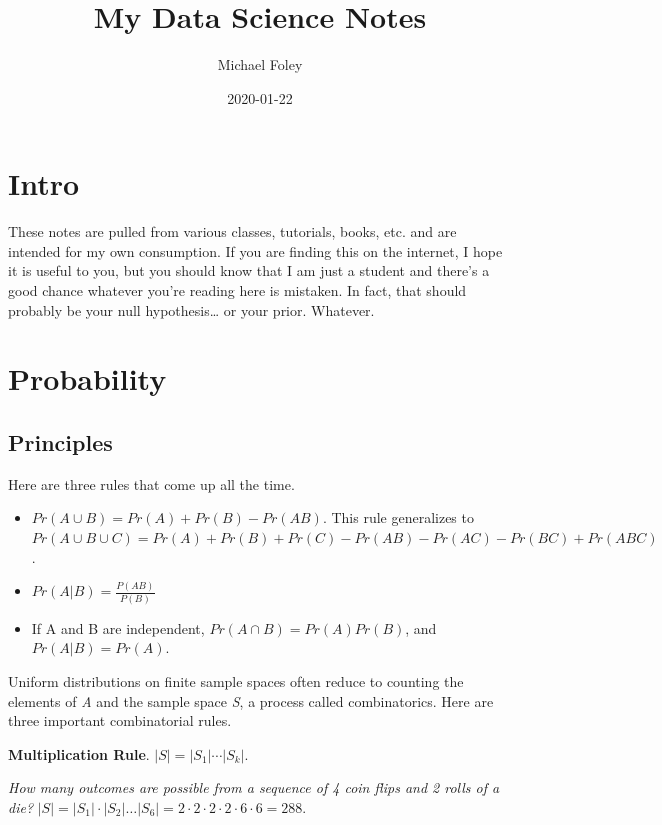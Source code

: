 \documentclass[]{book}
\title{My Data Science Notes}
\author{Michael Foley}
\date{2020-01-22}
\begin{document}
\maketitle

{
\setcounter{tocdepth}{1}
\tableofcontents
}
\hypertarget{intro}{%
\chapter*{Intro}\label{intro}}

These notes are pulled from various classes, tutorials, books, etc. and are intended for my own consumption. If you are finding this on the internet, I hope it is useful to you, but you should know that I am just a student and there's a good chance whatever you're reading here is mistaken. In fact, that should probably be your null hypothesis\ldots{} or your prior. Whatever.

\hypertarget{probability}{%
\chapter{Probability}\label{probability}}

\hypertarget{principles}{%
\section{Principles}\label{principles}}

Here are three rules that come up all the time.

\begin{itemize}
\item
  \(Pr(A \cup B) = Pr(A)+Pr(B) - Pr(AB)\). This rule generalizes to
  \(Pr(A \cup B \cup C)=Pr(A)+Pr(B)+Pr(C)-Pr(AB)-Pr(AC)-Pr(BC)+Pr(ABC)\).
\item
  \(Pr(A|B) = \frac{P(AB)}{P(B)}\)
\item
  If A and B are independent, \(Pr(A \cap B) = Pr(A)Pr(B)\), and \(Pr(A|B)=Pr(A)\).
\end{itemize}

Uniform distributions on finite sample spaces often reduce to counting the elements of \emph{A} and the sample space \emph{S}, a process called combinatorics. Here are three important combinatorial rules.

\textbf{Multiplication Rule}. \(|S|=|S_1 |⋯|S_k|\).

\emph{How many outcomes are possible from a sequence of 4 coin flips and 2 rolls of a die?}
\(|S|=|S_1| \cdot |S_2| \dots |S_6| = 2 \cdot 2 \cdot 2 \cdot 2 \cdot 6 \cdot 6 = 288\).
\end{document}
